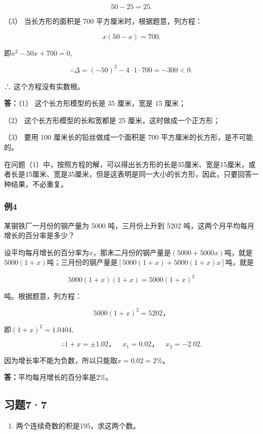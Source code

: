 \[
50 - 25 = 25.
\]

（3） 当长方形的面积是 700 平方厘米时，根据题意，列方程：

\[
x (50 - x) = 700.
\]

即\(x^{2} - 50x + 700 = 0,\)

\[
\therefore \Delta = (- 50) ^ {2} - 4 \cdot 1 \cdot 700 = - 300 <   0.
\]

∴ 这个方程没有实数根。

\textbf{答：}（1） 这个长方形模型的长是 35 厘米，宽是 15 厘米；

（2） 这个长方形模型的长和宽都是 25 厘米，这时做成一个正方形；

（3） 要用 100 厘米长的铅丝做成一个面积是 700
平方厘米的长方形，是不可能的。


在问题（1）中，按照方程的解，可以得出长方形的长是35厘米、宽是15厘米，或者长是15厘米、宽是35厘米，但是这表明是同一大小的长方形，因此，只要回答一种结果，不必重复。

\subsubsection{例4}

某钢铁厂一月份的钢产量为 5000 吨，三月份上升到 5202
吨，这两个月平均每月增长的百分率是多少？


设平均每月增长的百分率为\(x\)，那末二月份的钢产量是\((5000 + 5000x)\)吨，就是\(5000(1 + x)\)吨；三月份的钢产量是\([5000(1 + x) + 5000(1 + x)x]\)吨，就是

\[
5000 (1 + x) (1 + x) = 5000 (1 + x) ^ {2}
\]

吨。根据题意，列方程：

\[
5000 (1 + x) ^ {2} = 5202\text{，}
\]

即\((1 + x)^{2} = 1.0404,\)

\[
\therefore 1 + x = \pm 1.02\text{，} \quad x _ {1} = 0.02\text{，} \quad x _ {2} = - 2.02.
\]

因为增长率不能为负数，所以只能取\(x = 0.02 = 2\%\)。

\textbf{答：}平均每月增长的百分率是2\%。

\subsection{习题7·7}

\begin{enumerate}
\item
  两个连续奇数的积是195，求这两个数。
\end{enumerate}

